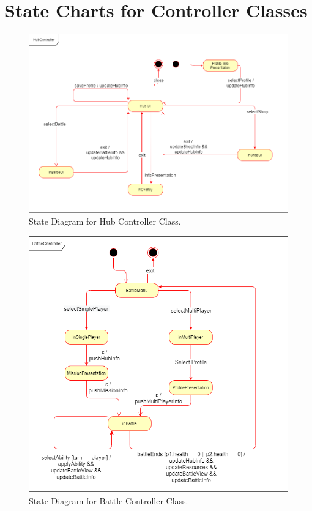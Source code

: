 \documentclass[]{article}
\begin{document}


\section{State Charts for Controller Classes}
\label{sec:state_charts_for_controller_classes}
\begin{figure}[H]
    \centering
    \includegraphics[width=\textwidth]{HubController.png}
    \caption{State Diagram for Hub Controller Class.}
    \label{fig:ca}
\end{figure}

\begin{figure}[H]
    \centering
    \includegraphics[width=\textwidth]{BattleController.png}
    \caption{State Diagram for Battle Controller Class.}
    \label{fig:ca}
\end{figure}
\end{document}

